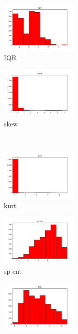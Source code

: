 \documentclass[a4paper]{article}
\begin{document}
\begin{figure}
\begin{subfigure}{0.32\textwidth}
        \includegraphics[width=3.85cm]{std_4_IQR}
        \caption{IQR}
        \label{fig:sub_std_5}
    \end{subfigure}\hfill
    \begin{subfigure}{0.32\textwidth}
        \centering
        \includegraphics[width=3.85cm]{std_5_skew}
        \caption{skew}
        \label{fig:sub_std_6}
    \end{subfigure}
    \\
    \begin{subfigure}{0.32\textwidth}
        \centering
        \includegraphics[width=3.85cm]{std_6_kurt}
        \caption{kurt}
        \label{fig:sub_std_7}
    \end{subfigure}\hfill
    \begin{subfigure}{0.32\textwidth}
        \centering
        \includegraphics[width=3.85cm]{std_7_sp_ent}
        \caption{sp ent}
        \label{fig:sub_std_8}
    \end{subfigure}\hfill
    \begin{subfigure}{0.32\textwidth}
        \centering
        \includegraphics[width=3.85cm]{std_8_sfm}

\end{subfigure}
\end{figure}
\end{document}
